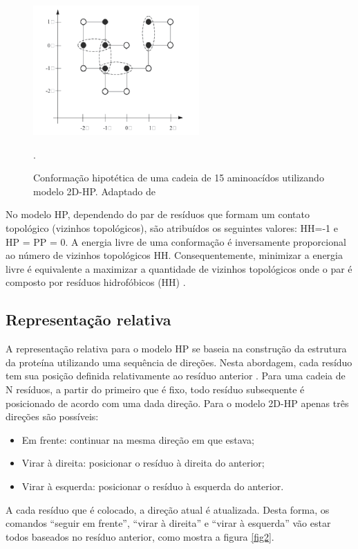 \documentclass[conference]{IEEEtran}
\begin{document}
\begin{figure}[ht]
	\centering
	\includegraphics[width=2.5in]{figure1.png}
	\caption{Conformação hipotética de uma cadeia de 15 aminoacídos utilizando modelo 2D-HP. Adaptado de \cite{lopes2008evolutionary}}.
	\label{fig1}
\end{figure}

No modelo HP, dependendo do par de resíduos que formam um contato topológico (vizinhos topológicos), são atribuídos os seguintes valores: HH=-1 e HP = PP = 0. A energia livre de uma conformação é inversamente proporcional ao número de vizinhos topológicos HH. Consequentemente, minimizar a energia livre é equivalente a maximizar a quantidade de vizinhos topológicos onde o par é composto por resíduos hidrofóbicos (HH) \cite{lopes2008evolutionary}.


\subsection{Representação relativa}

A representação relativa para o modelo HP se baseia na construção da estrutura da proteína utilizando uma sequência de direções. Nesta abordagem, cada resíduo tem sua posição definida relativamente ao resíduo anterior \cite{lopes2008evolutionary}. Para uma cadeia de N resíduos, a partir do primeiro que é fixo, todo resíduo subsequente é posicionado de acordo com uma dada direção. Para o modelo 2D-HP apenas três direções são possíveis:

\begin{itemize}
	\item Em frente: continuar na mesma direção em que estava;
	\item Virar à direita: posicionar o resíduo à direita do anterior;
	\item Virar à esquerda: posicionar o resíduo à esquerda do anterior.
\end{itemize}


A cada resíduo que é colocado, a direção atual é atualizada. Desta forma, os comandos “seguir em frente”, “virar à direita” e “virar à esquerda” vão estar todos baseados no resíduo anterior, como mostra a figura \ref{fig2}. 
\end{document}
